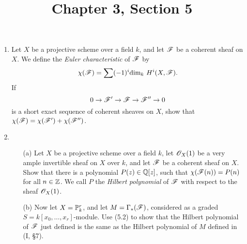 \documentclass{article}
\title{Chapter 3, Section 5}
\begin{document}
\maketitle
\begin{enumerate} [label=\textbf{\arabic*.}, leftmargin=0em]

\item Let $X$ be a projective scheme over a field $k$, and let $\mathscr{F}$ be a coherent sheaf on $X$. We define the \textit{Euler characteristic} of $\mathscr{F}$ by
\begin{equation*}
  \chi(\mathscr{F}) = \sum (-1)^i \text{dim}_k~H^i(X, \mathscr{F}).
\end{equation*}
If
\begin{equation*}
  0 \to \mathscr{F}' \to \mathscr{F} \to \mathscr{F}'' \to 0
\end{equation*}
is a short exact sequence of coherent sheaves on $X$, show that $\chi(\mathscr{F}) = \chi(\mathscr{F}') + \chi(\mathscr{F}'')$.

\item \begin{itemize}
  \item[(a)] Let $X$ be a projective scheme over a field $k$, let $\mathscr{O}_X(1)$ be a very ample invertible sheaf on $X$ over $k$, and let $\mathscr{F}$ be a coherent sheaf on $X$. Show that there is a polynomial $P(z) \in \mathbb{Q}[z]$, such that $\chi(\mathscr{F}(n)) = P(n)$ for all $n \in \mathbb{Z}$. We call $P$ the \textit{Hilbert polynomial} of $\mathscr{F}$ with respect to the sheaf $\mathscr{O}_X(1)$.
  \item[(b)] Now let $X = \mathbb{P}_k^r$, and let $M = \Gamma_*(\mathscr{F})$, considered as a graded $S = k[x_0, \dots, x_r]$-module. Use (5.2) to show that the Hilbert polynomial of $\mathscr{F}$ just defined is the same as the Hilbert polynomial of $M$ defined in (I, \S 7).
\end{itemize}


\end{enumerate}
\end{document}
